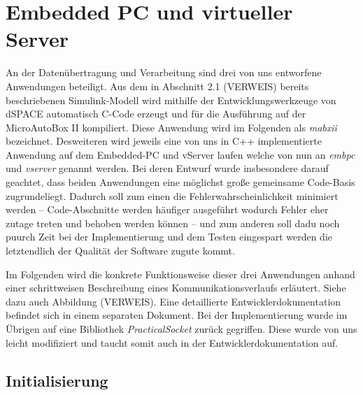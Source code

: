 \documentclass[fontsize = 12pt, paper = a4]{scrreprt}
\begin{document}
\newpage

    

   


 









  
 



   


\section{Embedded PC und virtueller Server}

An der Datenübertragung und Verarbeitung sind drei von uns entworfene Anwendungen beteiligt. Aus dem in Abschnitt 2.1 (VERWEIS) bereits beschriebenen Simulink-Modell wird mithilfe der Entwicklungswerkzeuge von dSPACE automatisch C-Code erzeugt und für die Ausführung auf der MicroAutoBox II kompiliert. Diese Anwendung wird im Folgenden als \textit{mabxii} bezeichnet. Desweiteren wird jeweils eine von uns in C++ implementierte Anwendung auf dem Embedded-PC und vServer laufen welche von nun an \textit{embpc} und \textit{vserver} genannt werden. Bei deren Entwurf wurde insbesondere darauf geachtet, dass beiden Anwendungen eine möglichst große gemeinsame Code-Basis zugrundeliegt. Dadurch soll zum einen die Fehlerwahrscheinlichkeit minimiert werden -- Code-Abschnitte werden häufiger ausgeführt wodurch Fehler eher zutage treten und behoben werden können -- und zum anderen soll dadu noch puurch Zeit bei der Implementierung und dem Testen eingespart werden die letztendlich der Qualität der Software zugute kommt. 

Im Folgenden wird die konkrete Funktionsweise dieser drei Anwendungen anhand einer schrittweisen Beschreibung eines Kommunikationsverlaufs erläutert. Siehe dazu auch Abbildung (VERWEIS). Eine detaillierte Entwicklerdokumentation befindet sich in einem separaten Dokument. Bei der Implementierung wurde im Übrigen auf eine Bibliothek \emph{PracticalSocket} zurück gegriffen. Diese wurde von uns leicht modifiziert und taucht somit auch in der Entwicklerdokumentation auf.

\subsection{Initialisierung}
\end{document}
